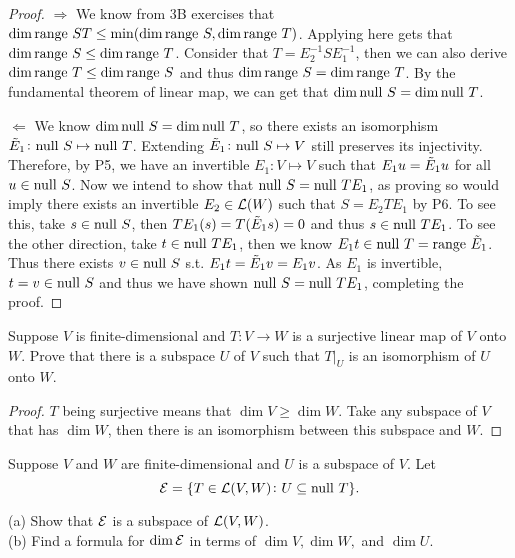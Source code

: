 \documentclass{extarticle}
\begin{document}
\begin{proof}
\(\Rightarrow\) We know from 3B exercises that \(\dim \text{range } ST \leq \min (\dim \text{range } S, \dim \text{range } T)\). 
Applying  here gets that \(\dim \text{range } S \leq \dim \text{range } T\). Consider that \(T = E^{-1}_2 S E_1^{-1}\), 
then we can also derive \(\dim \text{range } T \leq \dim \text{range } S\) and thus \(\dim \text{range } S = \dim \text{range } T\). 
By the fundamental theorem of linear map, we can get that \(\dim \text{null } S = \dim \text{null } T\). 

\(\Leftarrow\) We know \(\dim \text{null } S = \dim \text{null } T\), so there exists an isomorphism \(\Tilde{E}_1 \colon 
\text{null } S \mapsto \text{null } T\). Extending \(\Tilde{E}_1 \colon \text{null } S \mapsto V\) still preserves its injectivity. Therefore, 
by P5, we have an invertible \(E_1 \colon V \mapsto V\) such that \(E_1 u = \Tilde{E}_1 u\) for all \(u \in \text{null } S\). 
Now we intend to show that \(\text{null } S = \text{null } T E_1\), as proving so would imply there exists an invertible 
\(E_2 \in \mathcal{L}(W)\) such that \(S=E_2 T E_1\) by P6. To see this, take \(s \in \text{null } S\), then 
\(TE_1(s) = T(\Tilde{E}_1 s) = 0\) and thus \(s \in \text{null } TE_1\). To see the other direction, take 
\(t \in \text{null } T E_1\), then we know \(E_1 t \in \text{null } T = \text{range } \Tilde{E}_1\). Thus there exists \(v \in \text{null } S\)
s.t. \(E_1 t = \Tilde{E}_1 v = E_1 v\). As \(E_1\) is invertible, \(t = v \in \text{null } S\) and thus we have shown 
\(\text{null } S = \text{null } TE_1\), completing the proof.   
\end{proof}

\begin{problem}{9}
    Suppose \(V\) is finite-dimensional and \(T \colon V \to W\) is a surjective linear map of \(V\)
    onto \(W\). Prove that there is a subspace \(U\) of \(V\) such that \(T |_U\) is an isomorphism 
    of \(U\) onto \(W\).
\end{problem}

\begin{proof}
\(T\) being surjective means that \(\dim V \geq \dim W\). Take any subspace of \(V\) that has 
\(\dim W\), then there is an isomorphism between this subspace and \(W\). 
\end{proof}

\begin{problem}{10}
    Suppose \(V\) and \(W\) are finite-dimensional and \(U\) is a subspace of \(V\). Let 
    \[\mathcal{E} = \{T \in \mathcal{L}(V, W) \colon U \subseteq \text{null } T\}.\]

    (a) Show that \(\mathcal{E}\) is a subspace of \(\mathcal{L}(V, W)\). \\ 
    (b) Find a formula for \(\dim \mathcal{E}\) in terms of \(\dim V, \dim W,\) and \(\dim U\). 
\end{problem}
\end{document}
